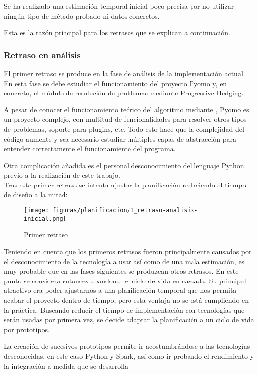 Se ha realizado una estimación temporal inicial poco precisa por no utilizar ningún tipo de método probado ni datos concretos.

Esta es la razón principal para los retrasos que se explican a continuación.

\subsubsection{Retraso en análisis}

El primer retraso se produce en la fase de análisis de la implementación actual. En esta fase se debe estudiar el funcionamiento del proyecto Pyomo y, en concreto, el módulo de resolución de problemas mediante Progressive Hedging. 

A pesar de conocer el funcionamiento teórico del algoritmo mediante \cite{TODO}, Pyomo es un proyecto complejo, con multitud de funcionalidades para resolver otros tipos de problemas, soporte para plugins, etc. Todo esto hace que la complejidad del código aumente y sea necesario estudiar múltiples capas de abstracción para entender correctamente el funcionamiento del programa.

Otra complicación añadida es el personal desconocimiento del lenguaje Python previo a la realización de este trabajo.\\

Tras este primer retraso se intenta ajustar la planificación reduciendo el tiempo de diseño a la mitad:

\begin{figure}[H]
    \centerline{\texttt{[image: figuras/planificacion/1\_retraso-analisis-inicial.png]}}
    \caption{Primer retraso}
\end{figure}

Teniendo en cuenta que los primeros retrasos fueron principalmente causados por el desconocimiento de la tecnología a usar así como de una mala estimación, es muy probable que en las fases siguientes se produzcan otros retrasos. En este punto se considera entonces abandonar el ciclo de vida en cascada. Su principal atractivo era poder ajustarnos a una planificación temporal que nos permita acabar el proyecto dentro de tiempo, pero esta ventaja no se está cumpliendo en la práctica. Buscando reducir el tiempo de implementación con tecnologías que serán usadas por primera vez, se decide adaptar la planificación a un ciclo de vida por prototipos. 

La creación de sucesivos prototipos permite ir acostumbrándose a las tecnologías desconocidas, en este caso Python y Spark, así como ir probando el rendimiento y la integración a medida que se desarrolla.

